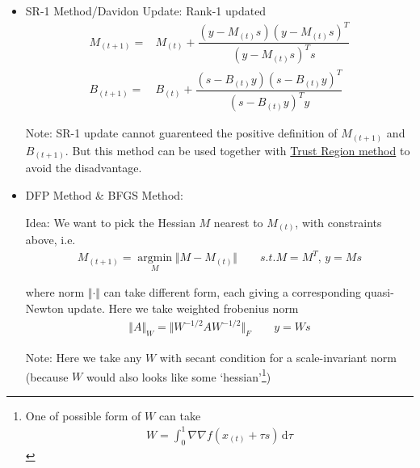 \begin{itemize}[topsep=2pt,itemsep=0pt]
    \item SR-1 Method/Davidon Update: Rank-1 updated 
    \begin{align}
        M_{(t+1)}=&M_{(t)}+\dfrac{(y-M_{(t)}s)(y-M_{(t)}s)^T}{(y-M_{(t)}s)^Ts}\\
        B_{(t+1)}=&B_{(t)}+\dfrac{(s-B_{(t)}y)(s-B_{(t)}y)^T}{(s-B_{(t)}y)^Ty}
    \end{align}

    Note: SR-1 update cannot guarenteed the positive definition of $ M_{(t+1)} $ and $ B_{(t+1)} $. But this method can be used together with \hyperlink{TrustRegionMethod}{Trust Region method} to avoid the disadvantage.
    \item DFP Method \& BFGS Method: 
    
    Idea: We want to pick the Hessian $ M $ nearest to $ M_{(t)} $, with constraints above, i.e.
    \begin{align}
        M_{(t+1)}=\mathop{\arg\min}\limits_{M}\Vert M-M_{(t)} \Vert  \qquad s.t.  M=M^T,\, y=Ms
    \end{align}

    where norm $ \Vert \cdot \Vert  $ can take different form, each giving a corresponding quasi-Newton update. Here we take weighted frobenius norm
    \begin{align}
        \Vert A \Vert_W=\Vert W^{-1/2}AW^{-1/2} \Vert_F   \qquad y=Ws
    \end{align}
    
    Note: Here we take any $ W $ with secant condition for a scale-invariant norm (because $ W $ would also looks like some `hessian'\footnote{One of possible form of $ W $ can take
    \begin{align}
        W=\int _0^1\nabla\nabla f\left(x_{(t)}+\tau s \right) \,\mathrm{d}\tau
    \end{align}
    })


\end{itemize}
